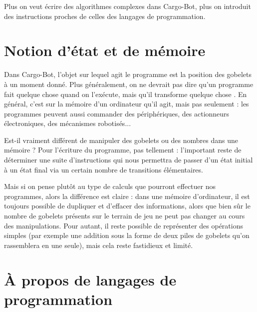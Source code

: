\documentclass[a4paper,12pt,fleqn]{article}
\begin{document}
Plus on veut écrire des algorithmes complexes dans Cargo-Bot, plus on
introduit des instructions proches de celles des langages de programmation.


\newpage
\section*{Notion d'état et de mémoire}

Dans Cargo-Bot, l'objet sur lequel agit le programme est la position
des gobelets à un moment donné.
Plus généralement, on ne devrait pas dire qu'un programme \og fait
quelque chose \fg quand on l'exécute, mais qu'il \og transforme quelque
chose \fg. En général, c'est sur la mémoire d'un ordinateur qu'il
agit, mais pas seulement : les programmes peuvent aussi commander des
périphériques, des actionneurs électroniques, des mécanismes robotisés...

\medskip

Est-il vraiment différent de manipuler des gobelets ou des nombres
dans une mémoire ? Pour l'écriture du programme, pas tellement :
l'important reste de déterminer une suite d'instructions qui nous
permettra de passer d'un état initial à un état final via un certain
nombre de transitions élémentaires.

Mais si on pense plutôt au type de calculs que pourront effectuer nos
programmes, alors la différence est claire : dans une mémoire
d'ordinateur, il est toujours possible de dupliquer et d'effacer des
informations, alors que bien sûr le nombre de gobelets présents sur le
terrain de jeu ne peut pas changer au cours des manipulations. Pour
autant, il reste possible de représenter des opérations simples (par
exemple une addition sous la forme de deux piles de gobelets qu'on
rassemblera en une seule), mais cela reste fastidieux et limité.


\section*{À propos de langages de programmation}
\end{document}
